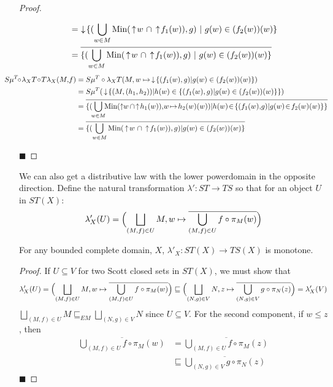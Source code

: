 \begin{proof}
\begin{description}
\begin{align*}
&= \,\da \{(\bigcup_{w\in M} \Min (\ua w\ \cap \ua f_1(w)), g)\ |\  g(w) \in (f_2(w))(w)\} \\
&= \overline{ \{ (\bigcup_{w\in M} \Min (\ua w\ \cap \ua f_1(w)), g)\ |\ g(w)\in (f_2(w))(w)\}}
\end{align*}
\begin{align*}
\!\!\!\!\!\!\!\!\!\!\!\!S\mu^T\!\!\circ\! \lambda_X T\!\circ\! T\lambda_X (M,\! f) &= S\mu^T\circ \lambda_X T(M, w\mapsto \da \{(f_1(w), g)|g(w) \in (f_2(w))(w)\}) \\
&= S\mu^T (\da \{(M,(h_1,h_2)) | h(w) \in \{(f_1(w), g)|g(w) \in (f_2(w))(w)\}\}) \\
&= \overline{ \{ (\!\bigcup_{w\in M}\!\! \Min (\!\ua\! w\!\ \cap\!\! \ua h_1(w)),\! w\!\mapsto\! h_2(w)(w)) | h(w)\! \in\! \{(f_1(w),\! g)|g(w)\!\in\! f_2(w)(w)\} \}} \\
&= \overline{ \{ (\bigcup_{w\in M} \Min (\ua w\ \cap \ua f_1(w)), g) | g(w)\in (f_2(w))(w)\}}
\end{align*}
\end{description} \hfill $\blacksquare$
\end{proof}

We can also get a distributive law with the lower powerdomain in the opposite direction.  Define the natural transformation $\lambda':ST\to TS$ so that for an object $U$ in $ST(X)$:
\[\lambda'_X (U) = \Bigl(\bigsqcup_{(M,f)\in U} M, w\mapsto\overline{\bigcup_{(M,f)\in U} f\circ \pi_M(w)}\Bigr)\]

\begin{proposition}
For any bounded complete domain, $X$, $\lambda'_X:ST(X)\to TS(X)$ is monotone.
\end{proposition}
\begin{proof}
If $U\subseteq V$ for two Scott closed sets in $ST(X)$, we must show that \[\lambda'_X(U) = \Bigl(\bigsqcup_{(M,f)\in U} M, w\mapsto\overline{\bigcup_{(M,f)\in U} f\circ \pi_M(w)}\Bigr) \sqsubseteq \Bigl(\bigsqcup_{(N,g)\in V} N, z\mapsto\overline{\bigcup_{(N,g)\in V} g\circ \pi_N(z)}\Bigr) = \lambda'_X(V)\]
$\bigsqcup_{(M,f)\in U} M \sqsubseteq_{EM} \bigsqcup_{(N,g)\in V} N$ since $U \subseteq V$.  For the second component, if $w\leq z$, then
\begin{align*}
\overline{\bigcup_{(M,f)\in U} f\circ \pi_M(w)} &=
\overline{\bigcup_{(M,f)\in U} f\circ \pi_M(z)} \\
&\sqsubseteq
\overline{\bigcup_{(N,g)\in V} g\circ \pi_N(z)}
\end{align*}
\hfill $\blacksquare$
\end{proof}

